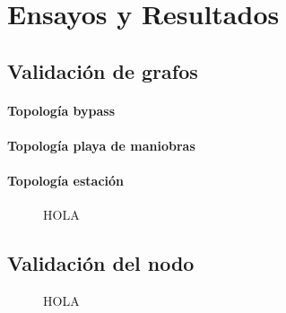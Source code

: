 
\chapter{Ensayos y Resultados} %

\label{Chapter4} %




\section{Validación de grafos}
	
	\subsubsection{Topología bypass}
	\subsubsection{Topología playa de maniobras}
	\subsubsection{Topología estación}
	
	
	\begin{figure}[h]
	\centering
		\caption{HOLA}
		\label{fig:hola}
	\end{figure}
		
\section{Validación del nodo}

	\begin{figure}[h]
	\centering
		\caption{HOLA}
		\label{fig:hola}
	\end{figure}
	
